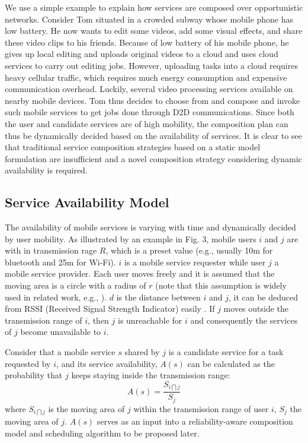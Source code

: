 \documentclass[journal]{IEEEtran}
\begin{document}

We use a simple example to explain how services are composed over opportunistic networks.
Consider Tom situated in a crowded subway whose mobile phone has low battery. 
He now wants to edit some videos, add some visual effects, and share these video clips to his friends.
Because of low battery of his mobile phone, he gives up local editing and uploads original videos to a cloud and uses cloud services to carry out editing jobs. However, uploading tasks into a cloud requires heavy cellular traffic, which requires much energy consumption and expensive communication overhead.
Luckily, several video processing services available on nearby mobile devices. Tom thus decides to choose from and compose and invoke such mobile services to get jobs done through D2D communications. 
Since both the user and candidate services are of high mobility, the composition plan can thus be dynamically decided based on the availability of services.  It is clear to see that traditional service composition strategies based on a static model formulation are insufficient and a novel composition strategy considering dynamic availability is required.

\subsection{Service Availability Model}

The availability of mobile services is varying with time and dynamically decided by user mobility. 
As illustrated by an example in Fig. 3, mobile users $i$ and $j$ are with in transmission rage $R$, which is a preset value (e.g., usually 10m for bluetooth and 25m for Wi-Fi). $i$ is a mobile service requester while user $j$ a mobile service provider. Each user moves freely and it is assumed that the moving area is a circle with a radius of $r$ (note that this assumption is widely used in related work, e.g., \cite{Yang2010, Deng2017, wu2001personal}). $d$ is the distance between $i$ and $j$, it can be deduced from RSSI (Received Signal Strength Indicator) easily \cite{benkic2008using}. If $j$ moves outside the transmission range of $i$, then $j$ is unreachable for $i$ and consequently the services of $j$ become unavailable to $i$.

Consider that a mobile service $s$ shared by $j$ is a candidate service for a task requested by $i$, and its service availability, $A(s)$ can be calculated as the probability that $j$ keeps staying inside the transmission range:
\begin{equation}
A(s) = \frac{S_{i \bigcap j}}{S_j}
\end{equation}
where $S_{i \bigcap j}$ is the moving area of $j$ within the transmission range of user $i$, $S_j$ the moving area of $j$. $A(s)$ serves as an input into a reliability-aware composition model and scheduling algorithm to be proposed later.
\end{document}
